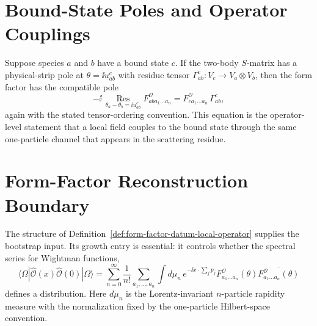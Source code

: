 \section{Bound-State Poles and Operator Couplings}

Suppose species \(a\) and \(b\) have a bound state \(c\).  If the
two-body \(S\)-matrix has a physical-strip pole at \(\theta=\ii u_{ab}^c\)
with residue tensor \(\Gamma_{ab}^c:V_c\to V_a\otimes V_b\), then the form
factor has the compatible pole
\[
  -\ii\,\operatorname*{Res}_{\theta_a-\theta_b=\ii u_{ab}^c}
  F^{\mathcal O}_{a b a_1\ldots a_n}
  =
  F^{\mathcal O}_{c a_1\ldots a_n}\,\Gamma_{ab}^c ,
\]
again with the stated tensor-ordering convention.  This equation is the
operator-level statement that a local field couples to the bound state through
the same one-particle channel that appears in the scattering residue.

\section{Form-Factor Reconstruction Boundary}

The structure of Definition~\ref{def:form-factor-datum-local-operator} supplies
the bootstrap input.  Its growth entry is essential: it controls whether the
spectral series
for Wightman functions,
\[
  \langle\Omega|\widehat{\mathcal O}(x)\widehat{\mathcal O}(0)|\Omega\rangle
  =
  \sum_{n=0}^{\infty}\frac{1}{n!}
  \sum_{a_1,\ldots,a_n}
  \int d\mu_n\,
  e^{-\ii x\cdot\sum_jp_j}
  F^{\mathcal O}_{a_1\ldots a_n}(\theta)
  \overline{F^{\mathcal O}_{a_1\ldots a_n}(\theta)}
\]
defines a distribution.  Here \(d\mu_n\) is the Lorentz-invariant
\(n\)-particle rapidity measure with the normalization fixed by the
one-particle Hilbert-space convention.

